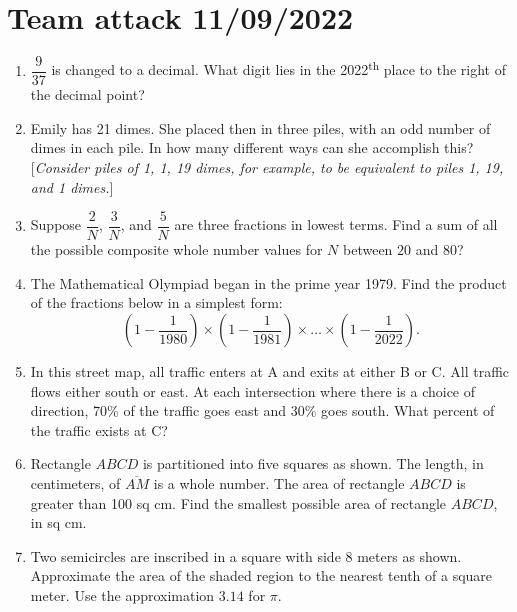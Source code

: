 \documentclass[11pt]{article}
\begin{document}
  \section*{Team attack 11/09/2022}
  \begin{enumerate}[leftmargin=3mm]
    \item $\dfrac{9}{37}$ is changed to a decimal. What digit lies in the 2022\textsuperscript{th} place to the right of the decimal point? %
    \item Emily has 21 dimes. She placed then in three piles, with an odd number of dimes in each pile. In how many different ways can she accomplish this? [\emph{Consider piles of 1, 1, 19 dimes, for example, to be equivalent to piles 1, 19, and 1 dimes.}] %
    \item Suppose $\dfrac{2}{N}$, $\dfrac{3}{N}$, and $\dfrac{5}{N}$ are three fractions in lowest terms. Find a sum of all the possible composite whole number values for $N$ between $20$ and $80$? %
    \item The Mathematical Olympiad began in the prime year 1979. Find the product of the fractions below in a simplest form:
    \[ 
      \left(1 - \frac{1}{1980}\right) \times \left(1 - \frac{1}{1981}\right) \times \ldots \times \left(1 - \frac{1}{2022}\right). 
    \] %
    \item In this street map, all traffic enters at A and exits at either B or C. All traffic flows either south or east. At each intersection where there is a choice of direction, 70\% of the traffic goes east and 30\% goes south. What percent of the traffic exists at C? %
    \item Rectangle $ABCD$ is partitioned into five squares as shown. The length, in centimeters, of $\overline{AM}$ is a whole number. The area of rectangle $ABCD$ is greater than 100 sq cm. Find the smallest possible area of rectangle $ABCD$, in sq cm. %
    \item Two semicircles are inscribed in a square with side $8$ meters as shown. Approximate the area of the shaded region to the nearest tenth of a square meter. Use the approximation $3.14$ for $\pi$. %
  \end{enumerate}
\end{document}
